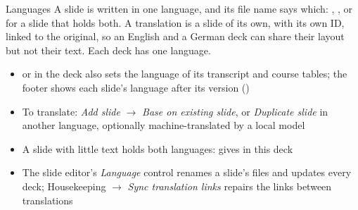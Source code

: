 
\begin{standardframe}{Languages}
	\small
	A slide is written in one language, and its file name says which:
	, , or  for a slide that holds both. A
	translation is a slide of its own, with its own ID, linked to the original,
	so an English and a German deck can share their layout but not their text.
	Each deck has one language.
	\par\medskip
	\begin{itemize}
		\item {}\SMCode{[en]} or \SMCode{[de]} in the deck also sets the language of its transcript and course tables; the footer shows each slide's language after its version ()
		\item To translate: \emph{Add slide} $\rightarrow$ \emph{Base on existing slide}, or \emph{Duplicate slide} in another language, optionally machine-translated by a local model
		\item A slide with little text holds both languages:  gives \emph{} in this deck
		\item The slide editor's \emph{Language} control renames a slide's files and updates every deck; Housekeeping $\rightarrow$ \emph{Sync translation links} repairs the links between translations
	\end{itemize}
\end{standardframe}
